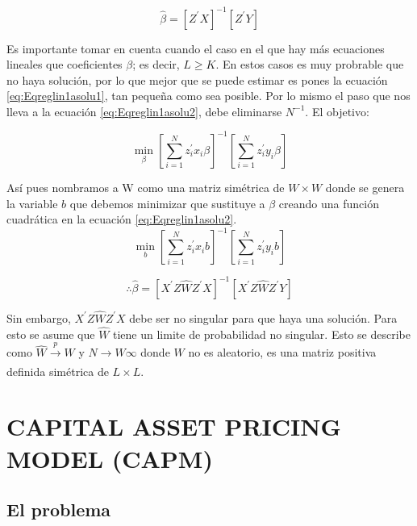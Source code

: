 \documentclass[
]{book}
\begin{document}
\begin{equation}
\hat{\beta}=[Z^{'}X]^{-1}[Z^{'}Y]
\end{equation}

Es importante tomar en cuenta cuando el caso en el que hay más ecuaciones lineales que coeficientes \(\beta\); es decir, \(L\geq K\). En estos casos es muy probrable que no haya solución, por lo que mejor que se puede estimar es pones la ecuación \eqref{eq:Eqreglin1asolu1}, tan pequeña como sea posible. Por lo mismo el paso que nos lleva a la ecuación \eqref{eq:Eqreglin1asolu2}, debe eliminarse \(N^{-1}\). El objetivo:

\begin{equation}
\min_{\beta} \left[\sum_{i=1}^{N}z_i^{'}x_i\beta\right]^{-1}\left[\sum_{i=1}^{N}z_i^{'}y_i\beta\right]
\label{eq:Eqreglin1asolu77}
\end{equation}

Así pues nombramos a W como una matriz simétrica de \(W\times W\) donde se genera la variable \(b\) que debemos minimizar que sustituye a \(\beta\) creando una función cuadrática en la ecuación \eqref{eq:Eqreglin1asolu2}.
\begin{equation}
\min_{b}\left[\sum_{i=1}^{N}z_i^{'}x_ib\right]^{-1}\left[\sum_{i=1}^{N}z_i^{'}y_ib\right]
\label{eq:Eqreglin1asolu78}
\end{equation}

\begin{equation}
\therefore\hat{\beta}=[X^{'}Z\hat{W}Z^{'}X]^{-1}[X^{'}Z\hat{W}Z^{'}Y]
\end{equation}

Sin embargo, \(X^{'}Z\hat{W}Z^{'}X\) debe ser no singular para que haya una solución. Para esto se asume que \(\hat{W}\) tiene un limite de probabilidad no singular. Esto se describe como \(\hat{W}\xrightarrow[]{p}W\) y \(N\xrightarrow[]{}W\infty\) donde \(W\) no es aleatorio, es una matriz positiva definida simétrica de \(L\times L\).

\hypertarget{capital-asset-pricing-model-capm}{%
\chapter{CAPITAL ASSET PRICING MODEL (CAPM)}\label{capital-asset-pricing-model-capm}}

\hypertarget{el-problema-3}{%
\section{El problema}\label{el-problema-3}}
\end{document}
